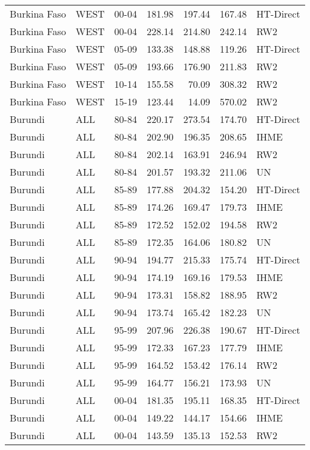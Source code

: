 \begin{longtable}{lllrrrl}
  Burkina Faso & WEST & 00-04 & 181.98 & 197.44 & 167.48 & HT-Direct \\ 
  Burkina Faso & WEST & 00-04 & 228.14 & 214.80 & 242.14 & RW2 \\ 
  Burkina Faso & WEST & 05-09 & 133.38 & 148.88 & 119.26 & HT-Direct \\ 
  Burkina Faso & WEST & 05-09 & 193.66 & 176.90 & 211.83 & RW2 \\ 
  Burkina Faso & WEST & 10-14 & 155.58 & 70.09 & 308.32 & RW2 \\ 
  Burkina Faso & WEST & 15-19 & 123.44 & 14.09 & 570.02 & RW2 \\ 
  Burundi & ALL & 80-84 & 220.17 & 273.54 & 174.70 & HT-Direct \\ 
  Burundi & ALL & 80-84 & 202.90 & 196.35 & 208.65 & IHME \\ 
  Burundi & ALL & 80-84 & 202.14 & 163.91 & 246.94 & RW2 \\ 
  Burundi & ALL & 80-84 & 201.57 & 193.32 & 211.06 & UN \\ 
  Burundi & ALL & 85-89 & 177.88 & 204.32 & 154.20 & HT-Direct \\ 
  Burundi & ALL & 85-89 & 174.26 & 169.47 & 179.73 & IHME \\ 
  Burundi & ALL & 85-89 & 172.52 & 152.02 & 194.58 & RW2 \\ 
  Burundi & ALL & 85-89 & 172.35 & 164.06 & 180.82 & UN \\ 
  Burundi & ALL & 90-94 & 194.77 & 215.33 & 175.74 & HT-Direct \\ 
  Burundi & ALL & 90-94 & 174.19 & 169.16 & 179.53 & IHME \\ 
  Burundi & ALL & 90-94 & 173.31 & 158.82 & 188.95 & RW2 \\ 
  Burundi & ALL & 90-94 & 173.74 & 165.42 & 182.23 & UN \\ 
  Burundi & ALL & 95-99 & 207.96 & 226.38 & 190.67 & HT-Direct \\ 
  Burundi & ALL & 95-99 & 172.33 & 167.23 & 177.79 & IHME \\ 
  Burundi & ALL & 95-99 & 164.52 & 153.42 & 176.14 & RW2 \\ 
  Burundi & ALL & 95-99 & 164.77 & 156.21 & 173.93 & UN \\ 
  Burundi & ALL & 00-04 & 181.35 & 195.11 & 168.35 & HT-Direct \\ 
  Burundi & ALL & 00-04 & 149.22 & 144.17 & 154.66 & IHME \\ 
  Burundi & ALL & 00-04 & 143.59 & 135.13 & 152.53 & RW2 \\ 

\end{longtable}
